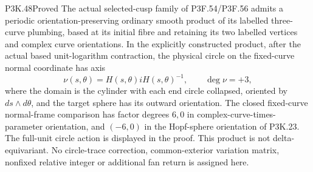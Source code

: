 \begin{statement}{P3K.48}{Proved}
The actual selected-cusp family of P3F.54/P3F.56 admits a periodic
orientation-preserving ordinary smooth product of its labelled
three-curve plumbing, based at its initial fibre and retaining its
two labelled vertices and complex curve orientations.
In the explicitly constructed product, after the actual based
unit-logarithm contraction, the physical circle on the fixed-curve
normal coordinate has axis
\[
 \nu(s,\theta)=H(s,\theta)iH(s,\theta)^{-1},\qquad
 \deg\nu=+3,
\]
where the domain is the cylinder with each end circle collapsed,
oriented by \(ds\wedge d\theta\), and the target sphere has its
outward orientation. The closed fixed-curve normal-frame comparison has
factor degrees \(6,0\) in complex-curve-times-parameter orientation,
and \((-6,0)\) in the Hopf-sphere orientation of P3K.23.
The full-unit circle action is displayed in
the proof. This product is not delta-equivariant. No circle-trace
correction, common-exterior variation matrix, nonfixed relative
integer or additional fan return is assigned here.
\end{statement}
